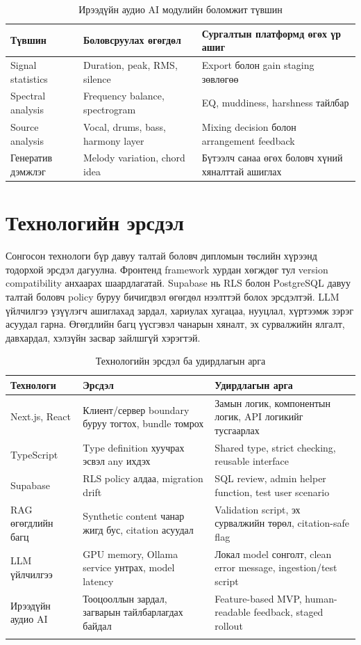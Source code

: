 \begin{table}[htbp]
  \centering
  \begin{tabular}{|p{}|p{}|p{}|}
    \hline
    \textbf{Түвшин} & \textbf{Боловсруулах өгөгдөл} & \textbf{Сургалтын платформд өгөх үр ашиг} \\ \hline
    Signal statistics & Duration, peak, RMS, silence & Export болон gain staging зөвлөгөө \\ \hline
    Spectral analysis & Frequency balance, spectrogram & EQ, muddiness, harshness тайлбар \\ \hline
    Source analysis & Vocal, drums, bass, harmony layer & Mixing decision болон arrangement feedback \\ \hline
    Генератив дэмжлэг & Melody variation, chord idea & Бүтээлч санаа өгөх боловч хүний хяналттай ашиглах \\ \hline
  \end{tabular}
  \caption{Ирээдүйн аудио AI модулийн боломжит түвшин}
  \label{tab:future-audio-ai}
\end{table}

\section{Технологийн эрсдэл}
Сонгосон технологи бүр давуу талтай боловч дипломын төслийн хүрээнд тодорхой эрсдэл дагуулна. Фронтенд framework хурдан хөгждөг тул version compatibility анхаарах шаардлагатай. Supabase нь RLS болон PostgreSQL давуу талтай боловч policy буруу бичигдвэл өгөгдөл нээлттэй болох эрсдэлтэй. LLM үйлчилгээ үзүүлэгч ашиглахад зардал, хариулах хугацаа, нууцлал, хүртээмж зэрэг асуудал гарна. Өгөгдлийн багц үүсгэвэл чанарын хяналт, эх сурвалжийн ялгалт, давхардал, хэлзүйн засвар зайлшгүй хэрэгтэй.

\begin{longtable}{|p{}|p{}|p{}|}
  \hline
  \textbf{Технологи} & \textbf{Эрсдэл} & \textbf{Удирдлагын арга} \\ \hline
  Next.js, React & Клиент/сервер boundary буруу тогтох, bundle томрох & Замын логик, компонентын логик, API логикийг тусгаарлах \\ \hline
  TypeScript & Type definition хуучрах эсвэл any ихдэх & Shared type, strict checking, reusable interface \\ \hline
  Supabase & RLS policy алдаа, migration drift & SQL review, admin helper function, test user scenario \\ \hline
  RAG өгөгдлийн багц & Synthetic content чанар жигд бус, citation асуудал & Validation script, эх сурвалжийн төрөл, citation-safe flag \\ \hline
  LLM үйлчилгээ & GPU memory, Ollama service унтрах, model latency & Локал model сонголт, clean error message, ingestion/test script \\ \hline
  Ирээдүйн аудио AI & Тооцооллын зардал, загварын тайлбарлагдах байдал & Feature-based MVP, human-readable feedback, staged rollout \\ \hline
  \caption{Технологийн эрсдэл ба удирдлагын арга}
  \label{tab:technology-risk}
\end{longtable}

